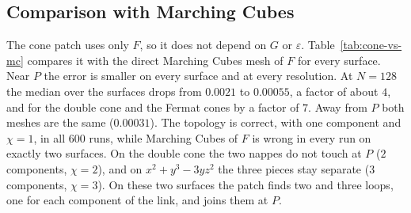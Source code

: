 \documentclass[12pt, a4paper, oneside]{book}
\theoremstyle{plain}
\theoremstyle{definition}
\theoremstyle{remark}
\theoremstyle{definition}
\begin{document}
\subsection{Comparison with Marching Cubes}

The cone patch uses only $F$, so it does not depend on $G$ or $\varepsilon$. Table~\ref{tab:cone-vs-mc} compares it with the direct Marching Cubes mesh of $F$ for every surface. Near $P$ the error is smaller on every surface and at every resolution. At $N=128$ the median over the surfaces drops from $0.0021$ to $0.00055$, a factor of about $4$, and for the double cone and the Fermat cones by a factor of $7$. Away from $P$ both meshes are the same ($0.00031$). The topology is correct, with one component and $\chi=1$, in all $600$ runs, while Marching Cubes of $F$ is wrong in every run on exactly two surfaces. On the double cone the two nappes do not touch at $P$ ($2$ components, $\chi=2$), and on $x^2+y^3-3yz^2$ the three pieces stay separate ($3$ components, $\chi=3$). On these two surfaces the patch finds two and three loops, one for each component of the link, and joins them at $P$.
\end{document}
